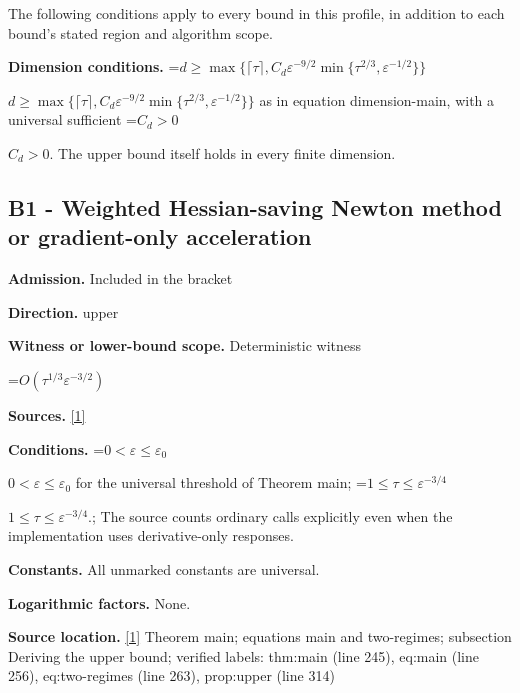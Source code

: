 \documentclass[10pt,a4paper]{article}
\newcommand{\AtlasMath}[1]{\par\begingroup\centering\setbox0=\hbox{$\displaystyle #1$}\ifdim\wd0>1.4\linewidth\typeout{ATLAS WIDE FORMULA: \the\wd0}\fi\ifdim\wd0>\linewidth\resizebox{\linewidth}{!}{\box0}\else\box0\fi\par\endgroup}
\newcommand{\AtlasInlineMath}[1]{\begingroup\setbox0=\hbox{$#1$}\ifdim\wd0>.4\linewidth\endgroup\AtlasMath{#1}\else\endgroup$#1$\fi}
\begin{document}
The following conditions apply to every bound in this profile, in addition to each bound's stated region and algorithm scope.



\textbf{Dimension conditions.} \AtlasInlineMath{d\ge\max\{\lceil\tau\rceil,C_d\varepsilon^{-9/2}\min\{\tau^{2/3},\varepsilon^{-1/2}\}\}} as in equation dimension-main, with a universal sufficient \AtlasInlineMath{C_d>0}. The upper bound itself holds in every finite dimension.



\subsection{B1 - Weighted Hessian-saving Newton method or gradient-only acceleration}


\textbf{Admission.} Included in the bracket



\textbf{Direction.} upper



\textbf{Witness or lower-bound scope.} Deterministic witness



\AtlasMath{O(\tau^{1/3}\varepsilon^{-3/2})}


\textbf{Sources.} \href{https://github.com/WU-Wendao/Colombo/blob/main/colombo_sensorium/Complexity_altas/data/sources/colombo/A4/manuscript.pdf}{[1]}



\textbf{Conditions.} \AtlasInlineMath{0<\varepsilon\le\varepsilon_0} for the universal threshold of Theorem main; \AtlasInlineMath{1\le\tau\le\varepsilon^{-3/4}}.; The source counts ordinary calls explicitly even when the implementation uses derivative-only responses.



\textbf{Constants.} All unmarked constants are universal.



\textbf{Logarithmic factors.} None.



\textbf{Source location.} \href{https://github.com/WU-Wendao/Colombo/blob/main/colombo_sensorium/Complexity_altas/data/sources/colombo/A4/manuscript.pdf}{[1]} Theorem main; equations main and two-regimes; subsection Deriving the upper bound; verified labels: thm:main (line 245), eq:main (line 256), eq:two-regimes (line 263), prop:upper (line 314)
\end{document}
